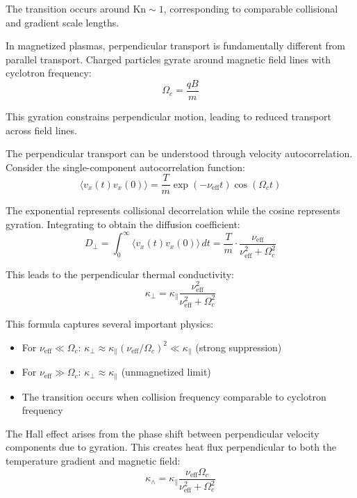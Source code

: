 \documentclass[12pt,a4paper]{article}
\newcommand{\Kn}{\text{Kn}}
\newcommand{\eff}{\text{eff}}
\begin{document}
The transition occurs around $\Kn \sim 1$, corresponding to comparable collisional and gradient scale lengths.

In magnetized plasmas, perpendicular transport is fundamentally different from parallel transport. Charged particles gyrate around magnetic field lines with cyclotron frequency:
\begin{equation}
\Omega_c = \frac{qB}{m}
\label{eq:cyclotron_frequency}
\end{equation}

This gyration constrains perpendicular motion, leading to reduced transport across field lines.

The perpendicular transport can be understood through velocity autocorrelation. Consider the single-component autocorrelation function:
\begin{equation}
\langle v_{x}(t) v_{x}(0) \rangle = \frac{T}{m} \exp(-\nu_{\eff} t) \cos(\Omega_c t)
\label{eq:vacf_x}
\end{equation}

The exponential represents collisional decorrelation while the cosine represents gyration. Integrating to obtain the diffusion coefficient:
\begin{equation}
D_{\perp} = \int_0^{\infty} \langle v_{x}(t) v_{x}(0) \rangle \, dt = \frac{T}{m} \cdot \frac{\nu_{\eff}}{\nu_{\eff}^2 + \Omega_c^2}
\label{eq:Dperp}
\end{equation}

This leads to the perpendicular thermal conductivity:
\begin{equation}
\boxed{\kappa_{\perp} = \kappa_{\parallel} \frac{\nu_{\eff}^2}{\nu_{\eff}^2 + \Omega_c^2}}
\label{eq:kappa_perp}
\end{equation}

This formula captures several important physics:
\begin{itemize}[leftmargin=*]
\item For $\nu_{\eff} \ll \Omega_c$: $\kappa_{\perp} \approx \kappa_{\parallel}(\nu_{\eff}/\Omega_c)^2 \ll \kappa_{\parallel}$ (strong suppression)
\item For $\nu_{\eff} \gg \Omega_c$: $\kappa_{\perp} \approx \kappa_{\parallel}$ (unmagnetized limit)
\item The transition occurs when collision frequency comparable to cyclotron frequency
\end{itemize}

The Hall effect arises from the phase shift between perpendicular velocity components due to gyration. This creates heat flux perpendicular to both the temperature gradient and magnetic field:
\begin{equation}
\boxed{\kappa_{\wedge} = \kappa_{\parallel} \frac{\nu_{\eff}\Omega_c}{\nu_{\eff}^2 + \Omega_c^2}}
\label{eq:kappa_wedge}
\end{equation}
\end{document}
